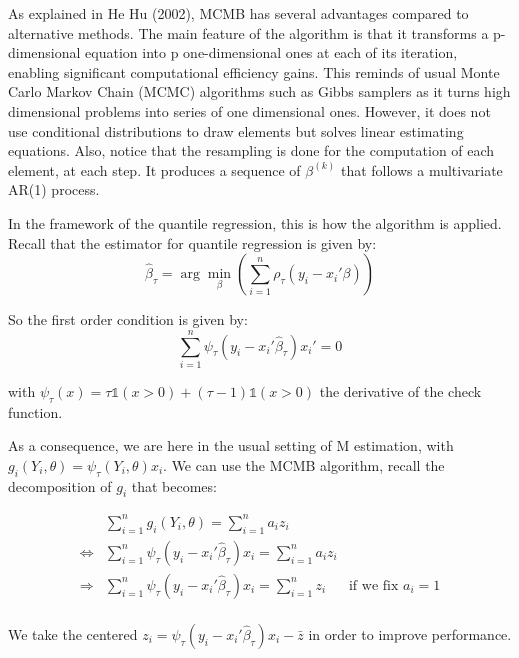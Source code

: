 \documentclass[11pt]{article}
\begin{document}
As explained in He Hu (2002), MCMB has several advantages compared to alternative methods. The main feature of the algorithm is that it transforms a p-dimensional equation into p one-dimensional ones at each of its iteration, enabling significant computational efficiency gains. This reminds of usual Monte Carlo Markov Chain (MCMC) algorithms such as Gibbs samplers as it turns high dimensional problems into series of one dimensional ones. However, it does not use conditional distributions to draw elements but solves linear estimating equations. Also, notice that the resampling is done for the computation of each element, at each step. It produces a sequence of $\beta^{(k)}$ that follows a multivariate AR(1) process. 
\smallskip


In the framework of the quantile regression, this is how the algorithm is applied. Recall that the estimator for quantile regression is given by:
\begin{equation}
\hat{\beta}_{\tau} = \arg\min_{\beta}\left(\sum_{i=1}^{n} \rho_{\tau}(y_{i}-x_{i}'\beta) \right)
\end{equation}

So the first order condition is given by:
\begin{equation}
\sum_{i=1}^{n} \psi_{\tau}(y_{i}-x_{i}'\hat{\beta}_{\tau})x_{i}' = 0
\end{equation}

with $\psi_{\tau}(x)=\tau\mathds{1}(x>0)+(\tau-1)\mathds{1}(x>0)$ the derivative of the check function.\bigskip

As a consequence, we are here in the usual setting of M estimation, with $g_{i}(Y_{i}, \theta)=\psi_{\tau}(Y_{i},\theta)x_{i}$. We can use the MCMB algorithm, recall the decomposition of $g_{i}$ that becomes:


\begin{align*}
&\sum_{i=1}^{n}g_{i}(Y_{i}, \theta)=\sum_{i=1}^{n}a_{i}z_{i} &\\
\Leftrightarrow &\sum_{i=1}^{n}\psi_{\tau}(y_{i}-x_{i}'\hat{\beta}_{\tau})x_{i} = \sum_{i=1}^{n}a_{i}z_{i}&\\
\Rightarrow &\sum_{i=1}^{n}\psi_{\tau}(y_{i}-x_{i}'\hat{\beta}_{\tau})x_{i} = \sum_{i=1}^{n}z_{i} &\text{if we fix }a_{i}=1\\
\end{align*}


We take the centered $z_{i}=\psi_{\tau}(y_{i}-x_{i}'\hat{\beta}_{\tau})x_{i}-\bar{z}$ in order to improve performance.
\end{document}

